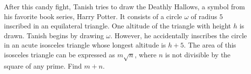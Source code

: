After this candy fight, Tanish tries to draw the Deathly Hallows, a symbol from his favorite book series, Harry Potter. It consists of a circle $\omega$ of radius $5$ inscribed in an equilateral triangle. One altitude of the triangle with height $h$ is drawn. Tanish begins by drawing $\omega$. However, he accidentally inscribes the circle in an acute isosceles triangle whose longest altitude is $h + 5$. The area of this isosceles triangle can be expressed as $m \sqrt{n}$, where $n$ is not divisible by the square of any prime. Find $m + n$.
